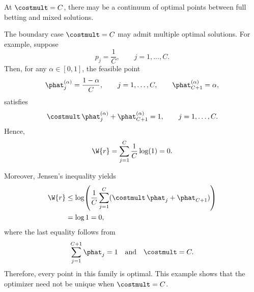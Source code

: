 
At \(\costmult=C\), there may be a continuum of optimal points between full betting and mixed solutions.

\begin{remark}[Degeneracy at \(\costmult=C\)]
    The boundary case \(\costmult=C\) may admit multiple optimal solutions.
    For example, suppose
    \[
        p_j=\frac1C,
        \qquad j=1,\ldots,C.
    \]
    Then, for any \(\alpha\in[0,1]\), the feasible point
    \[
        \phat_j^{(\alpha)}
        =
        \frac{1-\alpha}{C},
        \qquad
        j=1,\ldots,C,
        \qquad
        \phat_{C+1}^{(\alpha)}
        =
        \alpha,
    \]
    satisfies
    \[
        \costmult\,\phat_j^{(\alpha)}
        +
        \phat_{C+1}^{(\alpha)}
        =
        1,
        \qquad
        j=1,\ldots,C.
    \]
    Hence,
    \[
        \W{r}
        =
        \sum_{j=1}^{C}
        \frac1C
        \log(1)
        =
        0.
    \]

    Moreover, Jensen's inequality yields
    \begin{align*}
        \W{r}
         & \le \log\!\left(
        \frac1C
        \sum_{j=1}^{C}
        (\costmult\,\phat_j+\phat_{C+1})
        \right)               \\
         & =           \log 1
        =               0,
    \end{align*}
    where the last equality follows from
    \[
        \sum_{j=1}^{C+1}\phat_j=1
        \quad\text{and}\quad
        \costmult=C.
    \]
    Therefore, every point in this family is optimal. This example shows that the optimizer need not be unique when \(\costmult=C\).
\end{remark}

